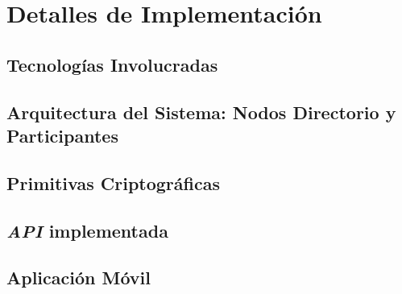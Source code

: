 \chapter{Detalles de Implementación}
\section{Tecnologías Involucradas}
\section{Arquitectura del Sistema: Nodos Directorio y Participantes}
\section{Primitivas Criptográficas}
\section{\emph{API} implementada}
\section{Aplicación Móvil}